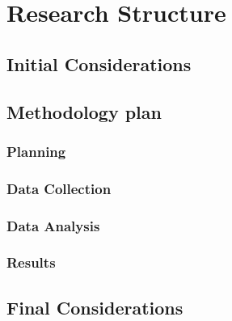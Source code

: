 \chapter{Research Structure}
\label{ch:metodologia}
\section{Initial Considerations}

\section{Methodology plan}

\subsection{Planning} 

\subsection{Data Collection} 

\subsection{Data Analysis} 

\subsection{Results} 

\section{Final Considerations}